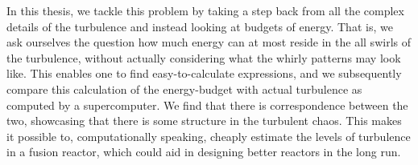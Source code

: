 In this thesis, we tackle this problem by taking a step back from all the complex details of the turbulence and instead looking at budgets of energy. That is, we ask ourselves the question how much energy can at most reside in the all swirls of the turbulence, without actually considering what the whirly patterns may look like. This enables one to find easy-to-calculate expressions, and we subsequently compare this calculation of the energy-budget with actual turbulence as computed by a supercomputer. We find that there is correspondence between the two, showcasing that there is some structure in the turbulent chaos. This makes it possible to, computationally speaking, cheaply estimate the levels of turbulence in a fusion reactor, which could aid in designing better reactors in the long run. 